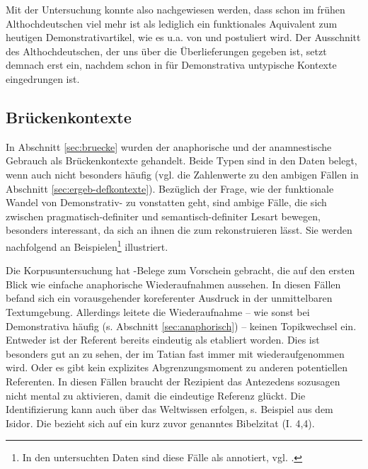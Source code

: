 Mit der Untersuchung konnte also nachgewiesen werden, dass  schon im frühen Althochdeutschen viel mehr ist als lediglich ein funktionales Aquivalent zum heutigen Demonstrativartikel, wie es u.a. von \textcite{Philippi1997} und \textcite{Demske2001} postuliert wird. Der Ausschnitt des Althochdeutschen, der uns über die Überlieferungen gegeben ist, setzt demnach erst ein, nachdem  schon in für Demonstrativa  untypische Kontexte eingedrungen ist. 


\subsection{Brückenkontexte}\label{sec:disk-bruecken}

In Abschnitt \ref{sec:bruecke} wurden der anaphorische  und der anamnestische  Gebrauch als Brückenkontexte  gehandelt. Beide Typen sind in den Daten belegt, wenn auch nicht besonders häufig (vgl. die Zahlenwerte zu den ambigen Fällen in Abschnitt \ref{sec:ergeb-defkontexte}). Bezüglich der Frage, wie der funktionale Wandel von Demonstrativ-  zu  vonstatten geht, sind ambige Fälle, die sich zwischen pragmatisch-definiter  und semantisch-definiter  Lesart bewegen, besonders interessant, da sich an ihnen die  zum  rekonstruieren lässt. Sie werden nachfolgend an Beispielen\footnote{In den untersuchten Daten sind diese Fälle als  annotiert, vgl. \textcite{HZKYL4_2020}.} illustriert. 

 

Die Korpusuntersuchung  hat -Belege zum Vorschein gebracht, die auf den ersten Blick wie einfache anaphorische  Wiederaufnahmen aussehen. In diesen Fällen befand sich ein vorausgehender koreferenter Ausdruck in der unmittelbaren Textumgebung. Allerdings leitete die Wiederaufnahme -- wie sonst bei Demonstrativa  häufig (s. Abschnitt \ref{sec:anaphorisch}) -- keinen Topikwechsel ein. Entweder ist der Referent bereits eindeutig als  etabliert worden. Dies ist besonders gut an  zu sehen, der im Tatian fast immer mit  wiederaufgenommen wird. Oder es gibt kein explizites Abgrenzungsmoment zu anderen potentiellen Referenten.
In diesen Fällen braucht der Rezipient das Antezedens sozusagen nicht mental zu aktivieren, damit die eindeutige Referenz  glückt. Die Identifizierung kann auch über das Weltwissen erfolgen, s. Beispiel  aus dem Isidor. Die     bezieht sich auf ein kurz zuvor genanntes Bibelzitat  (I. 4,4).

